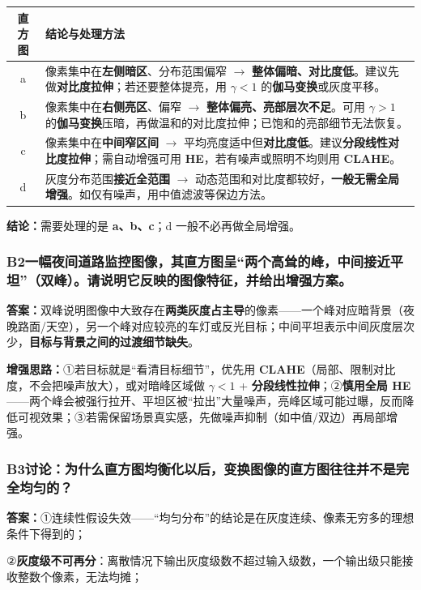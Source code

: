 \begingroup\small\renewcommand{\arraystretch}{1.25}
\begin{tabularx}{\linewidth}{@{}cX@{}}
\toprule
\textbf{直方图} & \textbf{结论与处理方法}\\\midrule
a & 像素集中在\textbf{左侧暗区}、分布范围偏窄 $\to$ \textbf{整体偏暗、对比度低}。建议先做\textbf{对比度拉伸}；若还要整体提亮，用 $\gamma<1$ 的\textbf{伽马变换}或灰度平移。\\
b & 像素集中在\textbf{右侧亮区}、偏窄 $\to$ \textbf{整体偏亮、亮部层次不足}。可用 $\gamma>1$ 的\textbf{伽马变换}压暗，再做温和的对比度拉伸；已饱和的亮部细节无法恢复。\\
c & 像素集中在\textbf{中间窄区间} $\to$ 平均亮度适中但\textbf{对比度低}。建议\textbf{分段线性对比度拉伸}；需自动增强可用 \textbf{HE}，若有噪声或照明不均则用 \textbf{CLAHE}。\\
d & 灰度分布范围\textbf{接近全范围} $\to$ 动态范围和对比度都较好，\textbf{一般无需全局增强}。如仅有噪声，用中值滤波等保边方法。\\\bottomrule
\end{tabularx}\endgroup

\textbf{结论：}需要处理的是 \textbf{a、b、c}；d 一般不必再做全局增强。

\subsubsection*{B2\quad 一幅夜间道路监控图像，其直方图呈“两个高耸的峰，中间接近平坦”（双峰）。请说明它反映的图像特征，并给出增强方案。}
\textbf{答案：}双峰说明图像中大致存在\textbf{两类灰度占主导}的像素——一个峰对应暗背景（夜晚路面/天空），另一个峰对应较亮的车灯或反光目标；中间平坦表示中间灰度层次少，\textbf{目标与背景之间的过渡细节缺失}。

\textbf{增强思路：}①若目标就是“看清目标细节”，优先用 \textbf{CLAHE}（局部、限制对比度，不会把噪声放大），或对暗峰区域做 $\gamma<1$ + \textbf{分段线性拉伸}；②\textbf{慎用全局 HE}——两个峰会被强行拉开、平坦区被“拉出”大量噪声，亮峰区域可能过曝，反而降低可视效果；③若需保留场景真实感，先做噪声抑制（如中值/双边）再局部增强。

\subsubsection*{B3\quad 讨论：为什么直方图均衡化以后，变换图像的直方图往往并不是完全均匀的？}
\textbf{答案：}①连续性假设失效——“均匀分布”的结论是在灰度连续、像素无穷多的理想条件下得到的；

②\textbf{灰度级不可再分}：离散情况下输出灰度级数不超过输入级数，一个输出级只能接收整数个像素，无法均摊；


